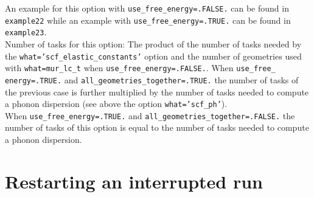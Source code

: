 \documentclass[12pt,a4paper,twoside]{report}
\begin{document}
An example for this option with \texttt{use\_free\_energy=.FALSE.}
can be found in \texttt{example22} while an example with
\texttt{use\_free\_energy=.TRUE.} can be found in \texttt{example23}. \\
Number of tasks for this option: The product of the number of tasks  
needed by the \texttt{what='scf\_elastic\_constants'} option 
and the number of geometries used with \texttt{what=mur\_lc\_t} when
\texttt{use\_free\_energy=.FALSE.}. When \texttt{use\_free\_}
\texttt{energy=.TRUE.}
and \texttt{all\_geometries\_together=.TRUE.} the number of tasks of the
previous case is further multiplied by the number of tasks needed to 
compute a phonon dispersion (see above the option \texttt{what='scf\_ph'}). \\
When \texttt{use\_free\_energy=.TRUE.} and 
\texttt{all\_geometries\_together=.FALSE.} the number of tasks of this
option is equal to the number of tasks needed to compute a phonon dispersion.


%
%

\newpage
{\color{dark-blue}\chapter{Restarting an interrupted run}}
\color{black}
\end{document}
